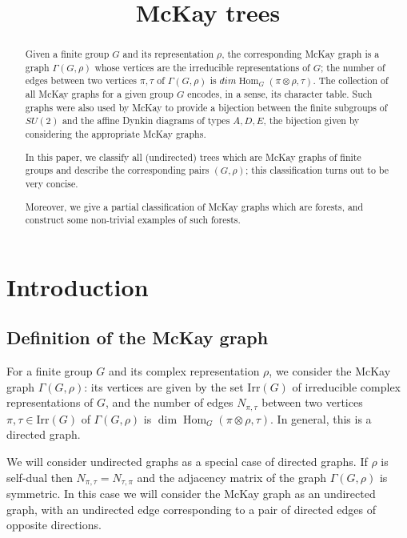 \documentclass[ALCO]{cedram}
\title{McKay trees}
\author[\initial{A.} Aizenbud]{\firstname{Avraham} \lastname{Aizenbud}}
\author[\initial{I.} Entova-Aizenbud]{\firstname{Inna} \lastname{Entova-Aizenbud}}
\newcommand{\Hom}{\operatorname{Hom}}
\newcommand{\Hom}{\operatorname{Hom}}
\begin{document}
\newtheorem{introtheorem}[cdrthm]{Theorem}
\newtheorem{problem}[cdrthm]{Problem}

\begin{abstract}
Given a finite group $G$ and its representation $\rho$, the corresponding McKay graph is a graph $\Gamma(G,\rho)$ whose vertices are the irreducible representations of $G$; the number of edges between two vertices $\pi,\tau$ of $\Gamma(G,\rho)$ is $dim \Hom_G(\pi\otimes \rho, \tau) $. The collection of all McKay graphs for a given group $G$ encodes, in a sense, its character table. Such graphs were also used by McKay to provide a bijection between the finite subgroups of $SU(2)$ and the affine Dynkin diagrams of types $A, D, E$, the bijection given by considering the appropriate McKay graphs. 

In this paper, we classify all (undirected) trees which are McKay graphs of finite groups and describe the corresponding pairs $(G,\rho)$; this classification turns out to be very concise.

Moreover, we give a partial classification of McKay graphs which are forests, and construct some non-trivial examples of such forests.
 \end{abstract}

\maketitle



\section{Introduction}


\subsection{Definition of the McKay graph}
For a finite group $G$ and its complex representation $\rho$, we consider the McKay graph $\Gamma(G, \rho)$: its vertices are given by the set $\mathrm{Irr}(G)$ of irreducible complex representations of $G$, and the number of edges $N_{\pi,\tau}$ between two vertices $\pi,\tau \in \mathrm{Irr}(G)$ of $\Gamma(G,\rho)$ is $\dim \Hom_G (\pi\otimes \rho, \tau) $. In general, this is a directed graph.

We will consider undirected graphs as a special case of directed graphs. If $\rho$ is self-dual then $N_{\pi,\tau}=N_{\tau,\pi}$ and the adjacency matrix of the graph $\Gamma(G,\rho)$ is symmetric. In this case we will consider the McKay graph as an undirected graph, with an undirected edge corresponding to a pair of directed edges of opposite directions.
\end{document}
